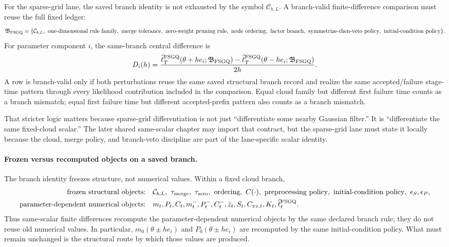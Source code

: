 For the sparse-grid lane, the saved branch identity is not exhausted by the
symbol \(\mathcal C_{b,L}\).  A branch-valid finite-difference comparison must
reuse the full fixed ledger:
\begin{equation}
  \mathfrak B_{\rm FSGQ}=
  \{\mathcal C_{b,L},\ \text{one-dimensional rule family},\ \text{merge tolerance},\
  \text{zero-weight pruning rule},\ \text{node ordering},\ \text{factor branch},\
  \text{symmetrize-then-veto policy},\ \text{initial-condition policy}\}.
  \label{eq:bf-hd-sgqf-branch-record}
\end{equation}
For parameter component \(i\), the same-branch central difference is
\begin{equation}
  D_i(h)=
  \frac{\widehat\ell_T^{\rm FSGQ}(\theta+h e_i;\mathfrak B_{\rm FSGQ})-
        \widehat\ell_T^{\rm FSGQ}(\theta-h e_i;\mathfrak B_{\rm FSGQ})}{2h}.
  \label{eq:bf-hd-sgqf-central-diff}
\end{equation}
A row is branch-valid only if both perturbations reuse the same saved structural
branch record and realize the same accepted/failure stage-time pattern through
every likelihood contribution included in the comparison.  Equal cloud family but
different first failure time counts as a branch mismatch; equal first failure
time but different accepted-prefix pattern also counts as a branch mismatch.

That stricter logic matters because sparse-grid differentiation is not just
“differentiate some nearby Gaussian filter.”  It is “differentiate the same
fixed-cloud scalar.”  The later shared same-scalar chapter may import that
contract, but the sparse-grid lane must state it locally because the cloud,
merge policy, and branch-veto discipline are part of the lane-specific scalar
identity.

\paragraph{Frozen versus recomputed objects on a saved branch.}
The branch identity freezes structure, not numerical values.  Within a fixed
cloud branch,
\begin{equation}
\begin{aligned}
  \text{frozen structural objects:}&\quad
  \mathcal C_{b,L},\ \tau_{\rm merge},\ \tau_{\rm zero},\ \text{ordering},\ C(\cdot),\
  \text{preprocessing policy},\ \text{initial-condition policy},\ \epsilon_S,\epsilon_P,\\
  \text{parameter-dependent numerical objects:}&\quad
  m_t,P_t,C_t,m_t^-,P_t^-,C_t^-,\bar z_t,S_t,C_{xz,t},K_t,
  \widehat\ell_t^{\rm FSGQ}.
\end{aligned}
  \label{eq:bf-hd-sgqf-frozen-vs-variable}
\end{equation}
Thus same-scalar finite differences recompute the parameter-dependent numerical
objects by the same declared branch rule; they do not reuse old numerical values.
In particular, \(m_0(\theta\pm he_i)\) and \(P_0(\theta\pm he_i)\) are
recomputed by the same initial-condition policy.  What must remain unchanged is
the structural route by which those values are produced.

